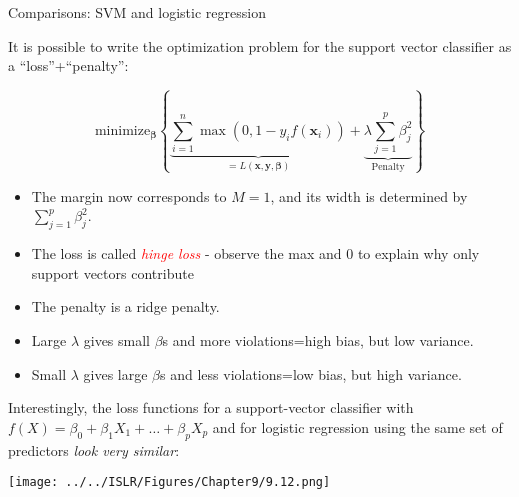 \documentclass[10pt,ignorenonframetext,]{beamer}
\begin{document}
\begin{frame}{Comparisons: SVM and logistic regression}
\protect\hypertarget{comparisons-svm-and-logistic-regression}{}

It is possible to write the optimization problem for the support vector
classifier as a ``loss''+``penalty'':

\[\text{minimize}_{\boldsymbol \beta} \left\{ \underbrace{\sum_{i=1}^n \max(0,1-y_i f({\boldsymbol x}_i))}_{=L(\boldsymbol x, \boldsymbol{y},\boldsymbol\beta)}+ \underbrace{\lambda \sum_{j=1}^p \beta_j^2}_{\text{Penalty}} \right\}\]

\begin{itemize}
\item
  The margin now corresponds to \(M=1\), and its width is determined by
  \(\sum_{j=1}^p \beta_j^2\).
\item
  The loss is called \emph{\textcolor{red}{hinge loss}} - observe the
  max and 0 to explain why only support vectors contribute
\item
  The penalty is a ridge penalty.
\item
  Large \(\lambda\) gives small \(\beta\)s and more violations=high
  bias, but low variance.
\item
  Small \(\lambda\) gives large \(\beta\)s and less violations=low bias,
  but high variance.
\end{itemize}

\end{frame}

\begin{frame}

Interestingly, the loss functions for a support-vector classifier with
\(f(X)=\beta_0 + \beta_1X_1 +\ldots + \beta_pX_p\) and for logistic
regression using the same set of predictors \emph{look very similar}:
\vspace{-2mm}

\centering

\texttt{[image: ../../ISLR/Figures/Chapter9/9.12.png]}

\end{frame}
\end{document}
